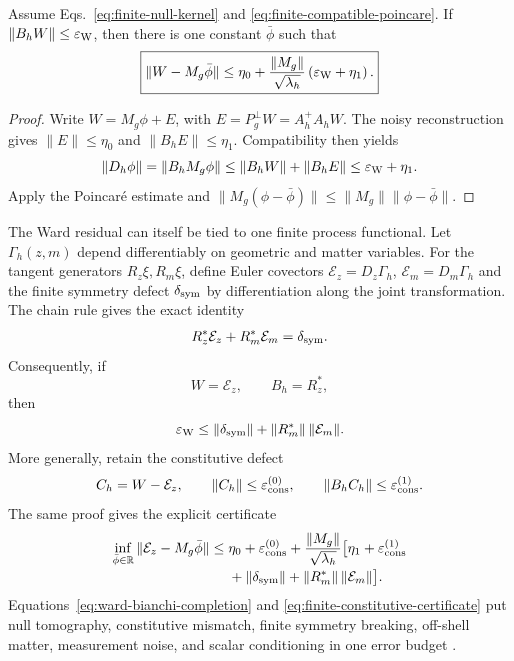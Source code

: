 \begin{theorem}
\label{thm:ward-bianchi-completion}
Assume Eqs.~\eqref{eq:finite-null-kernel} and
\eqref{eq:finite-compatible-poincare}.  If
\(\|B_hW\|\le\varepsilon_{\rm W}\), then there is one constant
\(\bar\phi\) such that
\begin{equation}
 \boxed{
 \|W-M_g\bar\phi\|
 \le
 \eta_0+\frac{\|M_g\|}{\sqrt{\lambda_h}}
 \left(\varepsilon_{\rm W}+\eta_1\right).}
 \label{eq:ward-bianchi-completion}
\end{equation}
\end{theorem}

\begin{proof}
Write \(W=M_g\phi+E\), with
\(E=P_g^\perp W=A_h^+A_hW\).  The noisy reconstruction gives
\(\|E\|\le\eta_0\) and \(\|B_hE\|\le\eta_1\).  Compatibility then yields
\[
 \|D_h\phi\|
 =\|B_hM_g\phi\|
 \le\|B_hW\|+\|B_hE\|
 \le\varepsilon_{\rm W}+\eta_1.
\]
Apply the Poincar\'e estimate and
\(\|M_g(\phi-\bar\phi)\|\le\|M_g\|\|\phi-\bar\phi\|\).
\end{proof}

The Ward residual can itself be tied to one finite process functional.
Let \(\Gamma_h(z,m)\) depend differentiably on geometric and matter
variables.  For the tangent generators \(R_z\xi,R_m\xi\), define Euler
covectors \(\mathcal E_z=D_z\Gamma_h\),
\(\mathcal E_m=D_m\Gamma_h\) and the finite symmetry defect
\(\delta_{\rm sym}\) by differentiation along the joint transformation.
The chain rule gives the exact identity
\begin{equation}
 R_z^*\mathcal E_z+R_m^*\mathcal E_m
 =\delta_{\rm sym}.
 \label{eq:finite-noether-defect}
\end{equation}
Consequently, if
\begin{equation}
 W=\mathcal E_z,\qquad B_h=R_z^*,
 \label{eq:constitutive-ward-identification}
\end{equation}
then
\begin{equation}
 \varepsilon_{\rm W}
 \le\|\delta_{\rm sym}\|
 +\|R_m^*\|\,\|\mathcal E_m\|.
 \label{eq:finite-ward-budget}
\end{equation}
More generally, retain the constitutive defect
\[
 C_h=W-\mathcal E_z,\qquad
 \|C_h\|\le\varepsilon_{\rm cons}^{(0)},\qquad
 \|B_hC_h\|\le\varepsilon_{\rm cons}^{(1)} .
\]
The same proof gives the explicit certificate
\begin{align}
\inf_{\bar\phi\in\mathbb R}
\|\mathcal E_z-M_g\bar\phi\|
\le{}&\eta_0+\varepsilon_{\rm cons}^{(0)}
+\frac{\|M_g\|}{\sqrt{\lambda_h}}\bigl[
\eta_1+\varepsilon_{\rm cons}^{(1)}
\nonumber\\[-2pt]
&+\|\delta_{\rm sym}\|
+\|R_m^*\|\,\|\mathcal E_m\|\bigr].
\label{eq:finite-constitutive-certificate}
\end{align}
Equations~\eqref{eq:ward-bianchi-completion} and
\eqref{eq:finite-constitutive-certificate} put null tomography, constitutive
mismatch, finite symmetry breaking, off-shell matter, measurement noise, and
scalar conditioning in one error budget \cite{XuWardBianchi2026}.

